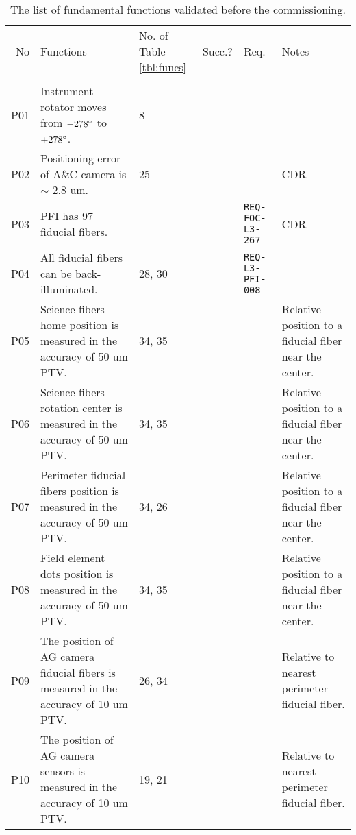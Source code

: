 

\begin{landscape}
\begin{longtable}{r|p{80mm}|p{25mm}|c|p{30mm}|p{45mm}}
\caption{
The list of fundamental functions validated before the commissioning.}
\label{tbl:subfuncs} 
\footnotesize
\\ \hline
No	& Functions & No. of Table \ref{tbl:funcs} & Succ.?  & Req.	& Notes \\ \hline \hline
\endhead
\endfoot
\multicolumn{6}{l}{\hspace{5mm} {\bf PFI (including Cable C)}} \\ \hline
P01	& Instrument rotator moves from $-278 ^\circ$ to $+278 ^\circ$.	& 8	&	&	& \\ \hline
P02	& Positioning error of A\&C camera is $\sim$ 2.8 um.	& 25	&	&	& CDR \\ \hline
P03 & PFI has 97 fiducial fibers.	&	& 	& {\tt REQ-FOC-L3-267}	& CDR \\ \hline 
P04 & All fiducial fibers can be back-illuminated.	&  28, 30	& 	& {\tt REQ-L3-PFI-008}	& \\ \hline
P05 & Science fibers home position is measured in the accuracy of 50 um PTV.	& 34, 35	& 	&	& Relative position to a fiducial fiber near the center. \\ \hline
P06 & Science fibers rotation center is measured in the accuracy of 50 um PTV.	& 34, 35	& 	&	& Relative position to a fiducial fiber near the center. \\ \hline
P07 & Perimeter fiducial fibers position is measured in the accuracy of 50 um PTV.	& 34, 26	& 	&	& Relative position to a fiducial fiber near the center. \\ \hline
P08 & Field element dots position is measured in the accuracy of 50 um PTV.	& 34, 35	& 	&	& Relative position to a fiducial fiber near the center. \\ \hline
P09 & The position of AG camera fiducial fibers is measured in the accuracy of 10 um PTV.	& 26, 34	& 	&	& Relative to nearest perimeter fiducial fiber. \\ \hline
P10 & The position of AG camera sensors is measured in the accuracy of 10 um PTV.	& 19, 21	& 	&	& Relative to nearest perimeter fiducial fiber. \\ \hline

\end{longtable}
\end{landscape}
